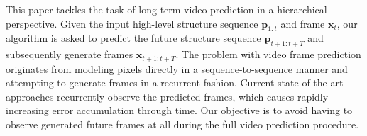 \documentclass{article}
\newcommand{\x}{{\mathbf{x}}}
\newcommand{\p}{{\mathbf{p}}}
\begin{document}
This paper tackles the task of long-term video prediction in a hierarchical perspective.
Given the input high-level structure sequence $\p_{1:t}$ and frame $\x_t$, our algorithm is asked to predict the future structure sequence $\p_{t+1:t+T}$ and subsequently generate frames $\x_{t+1:t+T}$.
The problem with video frame prediction originates from modeling pixels directly in a sequence-to-sequence manner and attempting to generate frames in a recurrent fashion.
Current state-of-the-art approaches recurrently observe the predicted frames, which causes rapidly increasing error accumulation through time.
Our objective is to avoid having to observe generated future frames at all during the full video prediction procedure.
\end{document}
